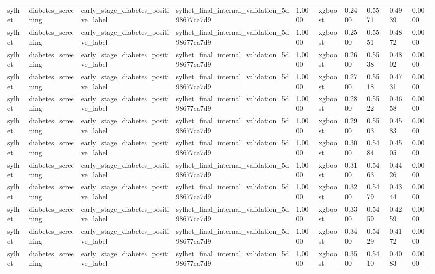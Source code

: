 \begin{tabular}{llllllllll}
sylhet & diabetes\_screening & early\_stage\_diabetes\_positive\_label & sylhet\_final\_internal\_validation\_5d98677ca7d9 & 1.0000 & xgboost & 0.2400 & 0.5571 & 0.4939 & 0.0000 \\
sylhet & diabetes\_screening & early\_stage\_diabetes\_positive\_label & sylhet\_final\_internal\_validation\_5d98677ca7d9 & 1.0000 & xgboost & 0.2500 & 0.5551 & 0.4872 & 0.0000 \\
sylhet & diabetes\_screening & early\_stage\_diabetes\_positive\_label & sylhet\_final\_internal\_validation\_5d98677ca7d9 & 1.0000 & xgboost & 0.2600 & 0.5538 & 0.4802 & 0.0000 \\
sylhet & diabetes\_screening & early\_stage\_diabetes\_positive\_label & sylhet\_final\_internal\_validation\_5d98677ca7d9 & 1.0000 & xgboost & 0.2700 & 0.5518 & 0.4731 & 0.0000 \\
sylhet & diabetes\_screening & early\_stage\_diabetes\_positive\_label & sylhet\_final\_internal\_validation\_5d98677ca7d9 & 1.0000 & xgboost & 0.2800 & 0.5522 & 0.4658 & 0.0000 \\
sylhet & diabetes\_screening & early\_stage\_diabetes\_positive\_label & sylhet\_final\_internal\_validation\_5d98677ca7d9 & 1.0000 & xgboost & 0.2900 & 0.5503 & 0.4583 & 0.0000 \\
sylhet & diabetes\_screening & early\_stage\_diabetes\_positive\_label & sylhet\_final\_internal\_validation\_5d98677ca7d9 & 1.0000 & xgboost & 0.3000 & 0.5484 & 0.4505 & 0.0000 \\
sylhet & diabetes\_screening & early\_stage\_diabetes\_positive\_label & sylhet\_final\_internal\_validation\_5d98677ca7d9 & 1.0000 & xgboost & 0.3100 & 0.5463 & 0.4426 & 0.0000 \\
sylhet & diabetes\_screening & early\_stage\_diabetes\_positive\_label & sylhet\_final\_internal\_validation\_5d98677ca7d9 & 1.0000 & xgboost & 0.3200 & 0.5479 & 0.4344 & 0.0000 \\
sylhet & diabetes\_screening & early\_stage\_diabetes\_positive\_label & sylhet\_final\_internal\_validation\_5d98677ca7d9 & 1.0000 & xgboost & 0.3300 & 0.5459 & 0.4259 & 0.0000 \\
sylhet & diabetes\_screening & early\_stage\_diabetes\_positive\_label & sylhet\_final\_internal\_validation\_5d98677ca7d9 & 1.0000 & xgboost & 0.3400 & 0.5429 & 0.4172 & 0.0000 \\
sylhet & diabetes\_screening & early\_stage\_diabetes\_positive\_label & sylhet\_final\_internal\_validation\_5d98677ca7d9 & 1.0000 & xgboost & 0.3500 & 0.5410 & 0.4083 & 0.0000 \\

\end{tabular}
